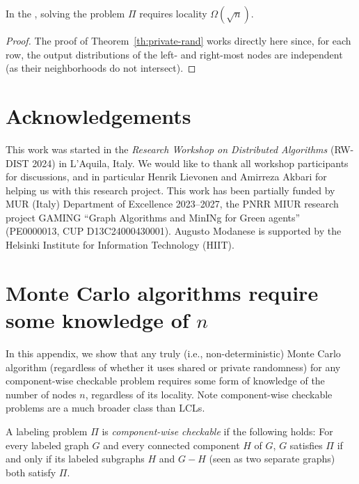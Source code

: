 \documentclass[11pt]{article}
\begin{document}
\begin{theorem}\label{thm:lb-boundep}
	In the \boundep, solving the problem $\Pi$ requires locality $\Omega(\sqrt{n})$.
\end{theorem}
\begin{proof}
	The proof of Theorem~\ref{th:private-rand} works directly here since, for each
	row, the output distributions of the left- and right-most nodes are
	independent (as their neighborhoods do not intersect).
\end{proof}


\ifanon\else
\section*{Acknowledgements}

This work was started in the \emph{Research Workshop on Distributed Algorithms} (RW-DIST 2024) in L'Aquila, Italy. We would like to thank all workshop participants for discussions, and in particular Henrik Lievonen and Amirreza Akbari for helping us with this research project. This work has been partially funded by MUR (Italy) Department of Excellence 2023--2027, the PNRR MIUR research project GAMING ``Graph Algorithms and MinINg for Green agents'' (PE0000013, CUP D13C24000430001). Augusto Modanese is supported by the Helsinki Institute for Information Technology (HIIT).

\fi 


\printbibliography

\newpage
\appendix

\section{Monte Carlo algorithms require some knowledge of \texorpdfstring{\boldmath$n$}{n}}
\label{appx:monte-carlo}

In this appendix, we show that any truly (i.e., non-deterministic) Monte Carlo
algorithm (regardless of whether it uses shared or private randomness) for any
component-wise checkable problem requires some form of knowledge of the number
of nodes $n$, regardless of its locality.
Note component-wise checkable problems are a much broader class than LCLs.

\begin{definition}
	A labeling problem $\Pi$ is \emph{component-wise checkable} if the following
	holds: 
	For every labeled graph $G$ and every connected component $H$ of $G$, $G$
	satisfies $\Pi$ if and only if its labeled subgraphs $H$ and $G - H$ (seen as
	two separate graphs) both satisfy $\Pi$.
\end{definition}
\end{document}
